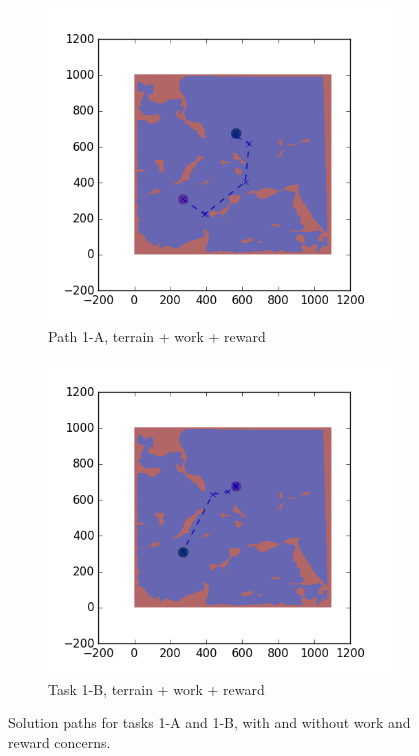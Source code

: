 \documentclass{tamuccthesis}
\begin{document}
\begin{figure}
  \begin{subfigure}[b]{0.4\textwidth}
        \centering
        \includegraphics[width=\textwidth,trim={3cm 3cm 3cm 3cm},clip]{EXP3RG_PathAa_-1_-1_-1_-1.png}
        \caption{{\small Path 1-A, terrain + work + reward}}
        \label{fig:Path_1-A_terrain_work_reward}
    \end{subfigure}
    \hfill
    \begin{subfigure}[b]{0.4\textwidth}  
        \centering 
        \includegraphics[width=\textwidth,trim={3cm 3cm 3cm 3cm},clip]{EXP3RG_PathAb_-1_-1_-1_-1.png}
        \caption{{\small Task 1-B, terrain + work + reward}}
        \label{fig:Path_5-B_terrain_work_reward}
    \end{subfigure}
      
    \caption{Solution paths for tasks 1-A and 1-B, with and without work and reward concerns.}
    \label{fig:Paths_1-A_1-B}
\end{figure}
\end{document}

